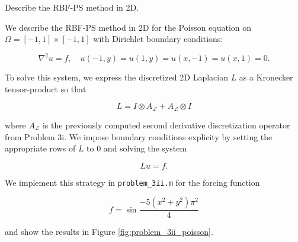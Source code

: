 Describe the RBF-PS method in 2D.

\begin{solution}
    We describe the RBF-PS method in 2D for the Poisson equation on $\Omega = [-1, 1] \times [-1, 1]$ with Dirichlet 
    boundary conditions:

    $$
    \nabla^2 u = f, \quad u(-1, y) = u(1, y) = u(x, -1) = u(x, 1) = 0.
    $$

    To solve this system, we express the discretized 2D Laplacian $L$ as a Kronecker tensor-product so that

    $$
    L = I \otimes A_{\mathcal{L}} + A_{\mathcal{L}} \otimes I
    $$

    where $A_{\mathcal{L}}$ is the previously computed second derivative discretization operator from Problem 3i. We 
    impose boundary conditions explicity by setting the appropriate rows of $L$ to 0 and solving the system

    $$
    L u = f.
    $$

    We implement this strategy in \texttt{problem\_3ii.m} for the forcing function 
    
    $$
    f = \sin{\frac{-5 (x^2 + y^2) \pi^2}{4}}
    $$

    and show the results in Figure \ref{fig:problem_3ii_poisson}.

    \vfill


\end{solution}
